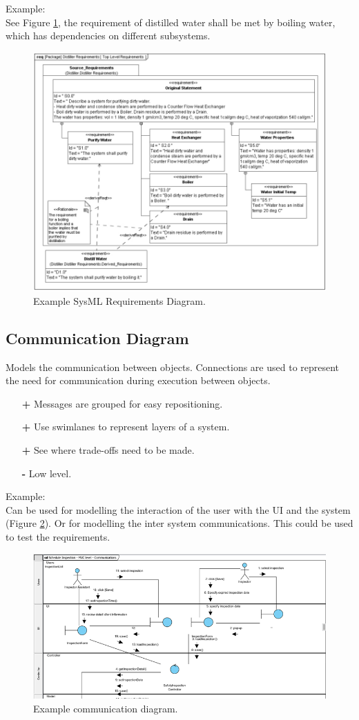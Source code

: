Example: \\
See Figure \ref{fig:sysml_req_diagram}, the requirement of distilled water shall be met by boiling water, which has dependencies on different subsystems.
\begin{figure}[h]
	\centering
	\includegraphics[width=0.65\linewidth]{Resources/4_sysml_req_diagram.png}
	\caption{Example SysML Requirements Diagram.}
	\label{fig:sysml_req_diagram}
\end{figure} 

\clearpage
\subsection*{Communication Diagram \cite{communication_diagram}}
Models the communication between objects. Connections are used to represent the need for communication during execution between objects.
\begin{itemize}
	\item[\textbf{+}] Messages are grouped for easy repositioning.
	\item[\textbf{+}] Use swimlanes to represent layers of a system.
	\item[\textbf{+}] See where trade-offs need to be made.
	\item[\textbf{-}] Low level.
\end{itemize}

Example:\\
Can be used for modelling the interaction of the user with the UI and the system (Figure \ref{fig:communication_diagram}). Or for modelling the inter system communications. This could be used to test the requirements.
\begin{figure}[h]
	\centering
	\includegraphics[width=1\linewidth]{Resources/4_communication_diagram.png}
	\caption{Example communication diagram.}
	\label{fig:communication_diagram}
\end{figure} 

